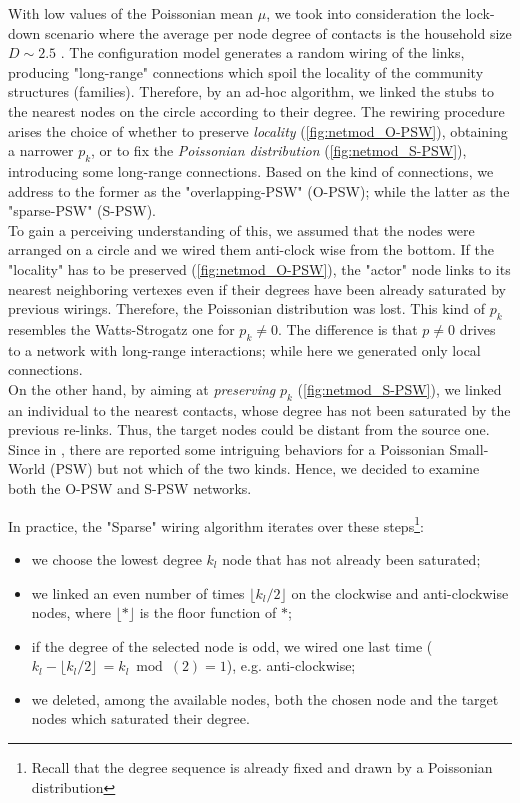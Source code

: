 \documentclass[a4paper,10pt, oneside]{book} %
\theoremstyle{definition}
\begin{document}
With low values of the Poissonian mean $\mu$, we took into consideration the lock-down scenario where the average per node degree of contacts is the household size $D \sim 2.5$ \cite{Thurner::NetBasedExpl}. The configuration model generates a random wiring of the links, producing "long-range" connections which spoil the locality of the community structures (families). Therefore, by an ad-hoc algorithm, we linked the stubs to the nearest nodes on the circle according to their degree. 
The rewiring procedure arises the choice of whether to preserve \textit{locality}  (\autoref{fig:netmod_O-PSW}), obtaining a narrower $p_k$, or to fix the \textit{Poissonian distribution} (\autoref{fig:netmod_S-PSW}), introducing some long-range connections. Based on the kind of connections, we address to the former as the "overlapping-PSW" (O-PSW); while the latter as the "sparse-PSW" (S-PSW). \\
To gain a perceiving understanding of this, we assumed that the nodes were arranged on a circle and we wired them anti-clock wise from the bottom. If the "locality" has to be preserved (\autoref{fig:netmod_O-PSW}), the "actor" node links to its nearest neighboring vertexes even if their degrees have been already saturated by previous wirings. Therefore, the Poissonian distribution was lost. This kind of $ p_k$ resembles the Watts-Strogatz one for $ p_k \neq 0$. The difference is that $ p \neq 0$ drives to a network with long-range interactions; while here we generated only local connections.\\
On the other hand, by aiming at \textit{preserving} $p_k$ (\autoref{fig:netmod_S-PSW}), we linked an individual to the nearest contacts, whose degree has not been saturated by the previous re-links. Thus, the target nodes could be distant from the source one. Since in \cite{Thurner::Appendix_NetBasedExpl}, there are reported some intriguing behaviors for a Poissonian Small-World (PSW) but not which of the two kinds. Hence, we decided to examine both the O-PSW and S-PSW networks.

In practice, the "Sparse" wiring algorithm iterates over these steps\footnote{Recall that the degree sequence is already fixed and drawn by a Poissonian distribution}:
\begin{itemize}
	\item we choose the lowest degree $k_l$ node that has not already been saturated;
	\item we linked an even number of times $\lfloor k_l /2 \rfloor$ on the clockwise and anti-clockwise nodes, where $\lfloor * \rfloor$ is the floor function of $*$;
	\item if the degree of the selected node is odd, we wired one last time ($k_l - \lfloor k_l /2 \rfloor \, = k_l \bmod(2) =  1$), e.g. anti-clockwise;
	\item we deleted, among the available nodes, both the chosen node and the target nodes which saturated their degree.
\end{itemize}
\end{document}

